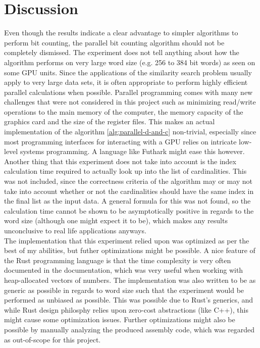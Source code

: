 \section{Discussion}
Even though the results indicate a clear advantage to simpler algorithms to perform bit counting, the parallel bit counting algorithm should not be completely dismissed. The experiment does not tell anything about how the algorithm performs on very large word size (e.g. 256 to 384 bit words) as seen on some GPU units\cite{techpowerup}. Since the applications of the similarity search problem usually apply to very large data sets, it is often appropriate to perform highly efficient parallel calculations when possible. Parallel programming comes with many new challenges that were not considered in this project such as minimizing read/write operations to the main memory of the computer, the memory capacity of the graphics card and the size of the register files. This makes an actual implementation of the algorithm \ref{alg:parallel-d-and-c} non-trivial, especially since most programming interfaces for interacting with a GPU relies on intricate low-level systems programming. A language like Futhark might ease this however\cite{futhark}.\\
Another thing that this experiment does not take into account is the index calculation time required to actually look up into the list of cardinalities. This was not included, since the correctness criteria of the algorithm may or may not take into account whether or not the cardinalities should have the same index in the final list as the input data. A general formula for this was not found, so the calculation time cannot be shown to be asymptotically positive in regards to the word size (although one might expect it to be), which makes any results unconclusive to real life applications anyways.\\
The implementation that this experiment relied upon was optimized as per the best of my abilities, but futher optimizations might be possible. A nice feature of the Rust programming language is that the time complexity is very often documented in the documentation, which was very useful when working with heap-allocated vectors of numbers. The implementation was also written to be as generic as possible in regards to word size such that the experiment would be performed as unbiased as possible. This was possible due to Rust's generics, and while Rust design philosphy relies upon zero-cost abstractions\cite{rust-lang} (like C++), this might cause some optimization issues. Further optimizations might also be possible by manually analyzing the produced assembly code, which was regarded as out-of-scope for this project.\\
